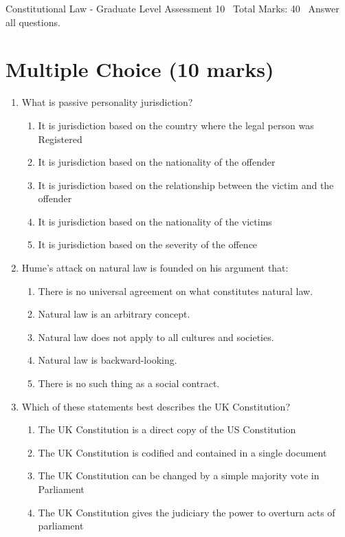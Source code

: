 \documentclass[12pt]{article}
\begin{document}
\begin{center}
Constitutional Law - Graduate Level Assessment 10 \
Total Marks: 40 \
Answer all questions.
\end{center}

\section*{Multiple Choice (10 marks)}
\begin{enumerate}[label=\arabic*.]
\item What is passive personality jurisdiction?
\begin{enumerate}[label=(\alph*)]
    \item It is jurisdiction based on the country where the legal person was Registered
    \item It is jurisdiction based on the nationality of the offender
    \item It is jurisdiction based on the relationship between the victim and the offender
    \item It is jurisdiction based on the nationality of the victims
    \item It is jurisdiction based on the severity of the offence
\end{enumerate}
\item Hume's attack on natural law is founded on his argument that:
\begin{enumerate}[label=(\alph*)]
    \item There is no universal agreement on what constitutes natural law.
    \item Natural law is an arbitrary concept.
    \item Natural law does not apply to all cultures and societies.
    \item Natural law is backward-looking.
    \item There is no such thing as a social contract.
\end{enumerate}
\item Which of these statements best describes the UK Constitution?
\begin{enumerate}[label=(\alph*)]
    \item The UK Constitution is a direct copy of the US Constitution
    \item The UK Constitution is codified and contained in a single document
    \item The UK Constitution can be changed by a simple majority vote in Parliament
    \item The UK Constitution gives the judiciary the power to overturn acts of parliament

\end{enumerate}
\end{enumerate}
\end{document}
